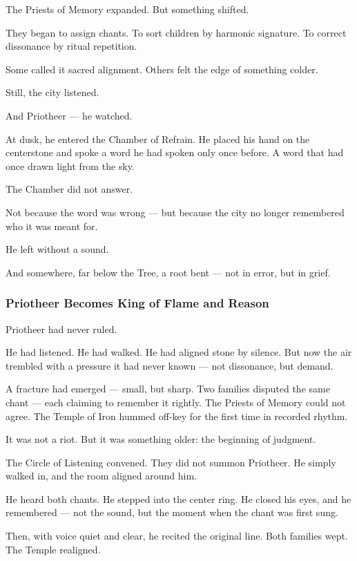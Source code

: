 \documentclass[12pt]{article}
\begin{document}
The Priests of Memory expanded.  
But something shifted.

They began to assign chants.  
To sort children by harmonic signature.  
To correct dissonance by ritual repetition.

Some called it sacred alignment.  
Others felt the edge of something colder.

Still, the city listened.

And Priotheer —  
he watched.

At dusk, he entered the Chamber of Refrain.  
He placed his hand on the centerstone and spoke a word he had spoken only once before.  
A word that had once drawn light from the sky.

The Chamber did not answer.

Not because the word was wrong —  
but because the city no longer remembered who it was meant for.

He left without a sound.

And somewhere, far below the Tree,  
a root bent — not in error,  
but in grief.

\dotfill

\subsubsection*{Priotheer Becomes King of Flame and Reason}

Priotheer had never ruled.

He had listened. He had walked. He had aligned stone by silence.  
But now the air trembled with a pressure it had never known — not dissonance, but demand.

A fracture had emerged — small, but sharp.  
Two families disputed the same chant — each claiming to remember it rightly.  
The Priests of Memory could not agree.  
The Temple of Iron hummed off-key for the first time in recorded rhythm.

It was not a riot.  
But it was something older: the beginning of judgment.

The Circle of Listening convened.  
They did not summon Priotheer.  
He simply walked in, and the room aligned around him.

He heard both chants.  
He stepped into the center ring.  
He closed his eyes, and he remembered — not the sound, but the moment when the chant was first sung.

Then, with voice quiet and clear, he recited the original line.  
Both families wept.  
The Temple realigned.
\end{document}
